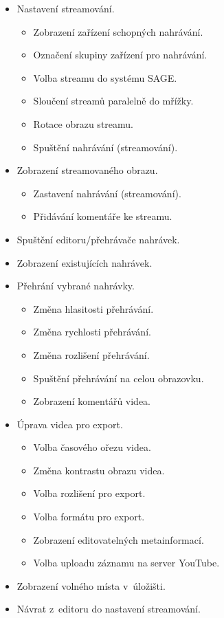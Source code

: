 \documentclass[thesis=M,czech]{FITthesis}[2012/06/26]
\begin{document}
\begin{itemize}
 \item Nastavení streamování.
   \begin{itemize}
	 \item Zobrazení zařízení schopných nahrávání.
	 \item Označení skupiny zařízení pro nahrávání.
	 \item Volba streamu do systému SAGE.
	 \item Sloučení streamů paralelně do mřížky.
	 \item Rotace obrazu streamu.
	 \item Spuštění nahrávání (streamování).
   \end{itemize}
 \item Zobrazení streamovaného obrazu.
   \begin{itemize}
	 \item Zastavení nahrávání (streamování).
 	 \item Přidávání komentáře ke streamu.
   \end{itemize}
 \item Spuštění editoru/přehrávače nahrávek.
 \item Zobrazení existujících nahrávek.
 \item Přehrání vybrané nahrávky.
   \begin{itemize}
 	 \item Změna hlasitosti přehrávání.
	 \item Změna rychlosti přehrávání.
	 \item Změna rozlišení přehrávání.
 	 \item Spuštění přehrávání na celou obrazovku.
 	 \item Zobrazení komentářů videa.
   \end{itemize}
 \item Úprava videa pro export.
   \begin{itemize}
	 \item Volba časového ořezu videa. 
     \item Změna kontrastu obrazu videa.
  	 \item Volba rozlišení pro export.
  	 \item Volba formátu pro export.
	 \item Zobrazení editovatelných metainformací.
	 \item Volba uploadu záznamu na server YouTube.
   \end{itemize}
 \item Zobrazení volného místa v~úložišti.
 \item Návrat z~editoru do nastavení streamování.
\end{itemize}
\end{document}
